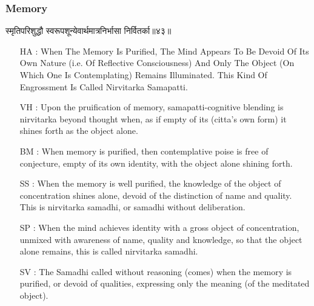 \begin{frame}[fragile]\frametitle{Memory}
\begin{sanskrit}
स्मृतिपरिशुद्धौ स्वरूपशून्येवार्थमात्रनिर्भासा निर्वितर्का॥४३॥
\end{sanskrit}

	\begin{itemize}
	\item [HA]: When The Memory Is Purified, The Mind Appears To Be Devoid Of Its Own Nature (i.e. Of Reflective Consciousness) And Only The Object (On Which One Is Contemplating) Remains Illuminated. This Kind Of Engrossment Is Called Nirvitarka Samapatti.
	\item [VH]: Upon the pruification of memory, samapatti-cognitive blending is nirvitarka beyond thought when, as if empty of its (citta’s own form) it shines forth as the object alone.
	\item [BM]: When memory is purified, then contemplative poise is free of conjecture, empty of its own identity, with the object alone shining forth.
	\item [SS]: When the memory is well purified, the knowledge of the object of concentration shines alone, devoid of the distinction of name and quality. This is nirvitarka samadhi, or samadhi without deliberation.
	\item [SP]: When the mind achieves identity with a gross object of concentration, unmixed with awareness of name, quality and knowledge, so that the object alone remains, this is called nirvitarka samadhi.
	\item [SV]: The Samadhi called without reasoning (comes) when the memory is purified, or devoid of qualities, expressing only the meaning (of the meditated object). 
	\end{itemize}
\end{frame}


